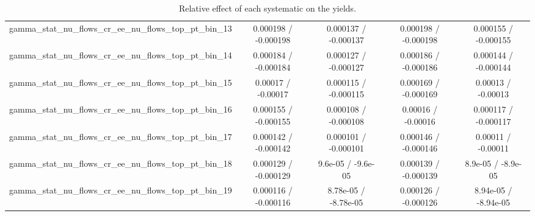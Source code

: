\documentclass[10pt]{article}
\begin{document}
\begin{table}[htbp]
\begin{center}
\begin{tabular}{|c|c|c|c|c|}
  gamma_stat_nu_flows_cr_ee_nu_flows_top_pt_bin_13 & 0.000198 / -0.000198 & 0.000137 / -0.000137 & 0.000198 / -0.000198 & 0.000155 / -0.000155 \\ 
  gamma_stat_nu_flows_cr_ee_nu_flows_top_pt_bin_14 & 0.000184 / -0.000184 & 0.000127 / -0.000127 & 0.000186 / -0.000186 & 0.000144 / -0.000144 \\ 
  gamma_stat_nu_flows_cr_ee_nu_flows_top_pt_bin_15 & 0.00017 / -0.00017 & 0.000115 / -0.000115 & 0.000169 / -0.000169 & 0.00013 / -0.00013 \\ 
  gamma_stat_nu_flows_cr_ee_nu_flows_top_pt_bin_16 & 0.000155 / -0.000155 & 0.000108 / -0.000108 & 0.00016 / -0.00016 & 0.000117 / -0.000117 \\ 
  gamma_stat_nu_flows_cr_ee_nu_flows_top_pt_bin_17 & 0.000142 / -0.000142 & 0.000101 / -0.000101 & 0.000146 / -0.000146 & 0.00011 / -0.00011 \\ 
  gamma_stat_nu_flows_cr_ee_nu_flows_top_pt_bin_18 & 0.000129 / -0.000129 & 9.6e-05 / -9.6e-05 & 0.000139 / -0.000139 & 8.9e-05 / -8.9e-05 \\ 
  gamma_stat_nu_flows_cr_ee_nu_flows_top_pt_bin_19 & 0.000116 / -0.000116 & 8.78e-05 / -8.78e-05 & 0.000126 / -0.000126 & 8.94e-05 / -8.94e-05 \\ 
\hline 
\end{tabular} 
\caption{Relative effect of each systematic on the yields.} 
\end{center} 
\end{table} 
\end{document}
